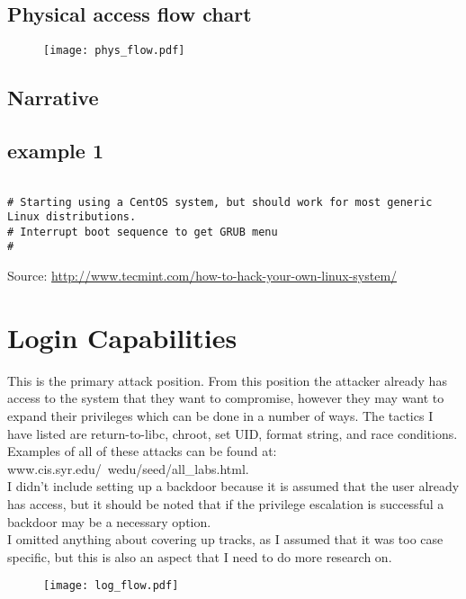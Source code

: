 \documentclass{article}
\begin{document}
\subsection{Physical access flow chart}
\begin{figure}[ht]
\centering
\texttt{[image: phys\_flow.pdf]}
\hspace*{-3cm}
\end{figure}

\subsection{Narrative}
\subsection{example 1}

\begin{verbatim}

# Starting using a CentOS system, but should work for most generic Linux distributions.
# Interrupt boot sequence to get GRUB menu
# 

\end{verbatim}
Source: \url{http://www.tecmint.com/how-to-hack-your-own-linux-system/}\\


\pagebreak


\section{Login Capabilities}
This is the primary attack position. From this position the attacker already has access to the system that they want to compromise, however they may want to expand their privileges which can be done in a number of ways. The tactics I have listed are return-to-libc, chroot, set UID, format string, and race conditions. Examples of all of these attacks can be found at: www.cis.syr.edu/~wedu/seed/all\_labs.html.\\
I didn't include setting up a backdoor because it is assumed that the user already has access, but it should be noted that if the privilege escalation is successful a backdoor may be a necessary option.\\
I omitted anything about covering up tracks, as I assumed that it was too case specific, but this is also an aspect that I need to do more research on.\\
\begin{figure}[ht]
\centering
\texttt{[image: log\_flow.pdf]}
\hspace*{-3cm}
\end{figure}
\pagebreak
\end{document}
